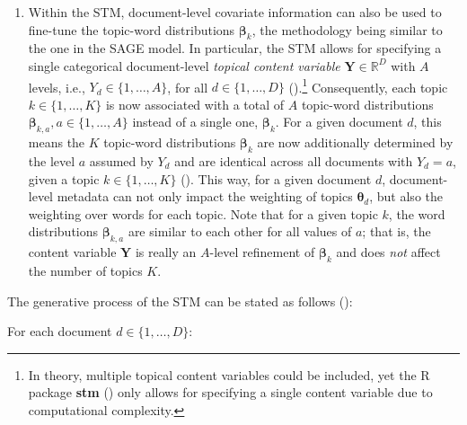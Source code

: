 \begin{enumerate}[label=(\roman*)]
\item Within the STM, document-level covariate information can also be used to fine-tune the topic-word distributions $\boldsymbol{\beta}_k$, the methodology being similar to the one in the SAGE model. In particular, the STM allows for specifying a single categorical document-level \textit{topical content variable} $\boldsymbol{Y}\in \mathbb{R}^D$ with $A$ levels, i.e., $Y_d \in \{1,\dots,A\}$, for all $d \in \{1,\dots,D\}$ (\citealp{stm}).\footnote{In theory, multiple topical content variables could be included, yet the R package \textbf{stm} (\citealp{stm}) only allows for specifying a single content variable due to computational complexity.} Consequently, each topic $k \in \{1,\dots,K\}$ is now associated with a total of $A$ topic-word distributions $\boldsymbol{\beta}_{k,a}, a \in \{1,\dots,A\}$ instead of a single one, $\boldsymbol{\beta}_k$. For a given document $d$, this means the $K$ topic-word distributions $\boldsymbol{\beta}_k$ are now additionally determined by the level $a$ assumed by $Y_d$ and are identical across all documents with $Y_d = a$, given a topic $k \in \{1,\dots,K\}$ (\citealp{roberts2016model}). This way, for a given document $d$, document-level metadata can not only impact the weighting of topics $\boldsymbol{\theta}_d$, but also the weighting over words for each topic. Note that for a given topic $k$, the word distributions $\boldsymbol{\beta}_{k,a}$ are similar to each other for all values of $a$; that is, the content variable $\boldsymbol{Y}$ is really an $A$-level refinement of $\boldsymbol{\beta}_k$ and does \textit{not} affect the number of topics $K$.

\end{enumerate}

\noindent
The generative process of the STM can be stated as follows (\citealp{roberts2016model}):

\vspace{0.25cm}
\noindent
For each document $d \in \{1,\dots,D\}$:

